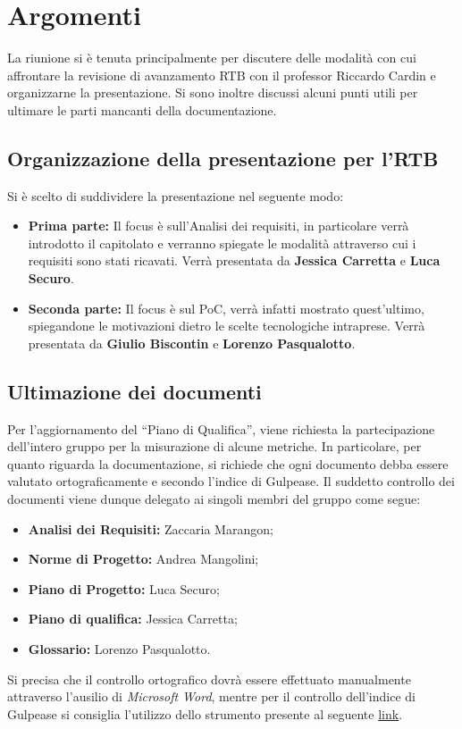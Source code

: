 \section{Argomenti} \label{sec:argomenti}
La riunione si è tenuta principalmente per discutere delle modalità con cui affrontare la revisione di avanzamento RTB con il professor Riccardo Cardin e organizzarne la presentazione. Si sono inoltre discussi alcuni punti utili per ultimare le parti mancanti della documentazione.

\subsection{Organizzazione della presentazione per l'RTB}
Si è scelto di suddividere la presentazione nel seguente modo:
\begin{itemize}
    \item \textbf{Prima parte:} Il focus è sull'Analisi dei requisiti, in particolare verrà introdotto il capitolato e verranno spiegate le modalità attraverso cui i requisiti sono stati ricavati. Verrà presentata da \textbf{Jessica Carretta} e \textbf{Luca Securo}.
    \item \textbf{Seconda parte:} Il focus è sul PoC, verrà infatti mostrato quest'ultimo, spiegandone le motivazioni dietro le scelte tecnologiche intraprese. Verrà presentata da \textbf{Giulio Biscontin} e \textbf{Lorenzo Pasqualotto}.
\end{itemize}

\subsection{Ultimazione dei documenti}
Per l'aggiornamento del ``Piano di Qualifica'', viene richiesta la partecipazione dell'intero gruppo per la misurazione di alcune metriche. In particolare, per quanto riguarda la documentazione, si richiede che ogni documento debba essere valutato ortograficamente e secondo l'indice di Gulpease. Il suddetto controllo dei documenti viene dunque delegato ai singoli membri del gruppo come segue:
\begin{itemize}
    \item \textbf{Analisi dei Requisiti:} Zaccaria Marangon;
    \item \textbf{Norme di Progetto:} Andrea Mangolini;
    \item \textbf{Piano di Progetto:} Luca Securo;
    \item \textbf{Piano di qualifica:} Jessica Carretta;
    \item \textbf{Glossario:} Lorenzo Pasqualotto.
\end{itemize}
Si precisa che il controllo ortografico dovrà essere effettuato manualmente attraverso l'ausilio di \textit{Microsoft Word}, mentre per il controllo dell'indice di Gulpease si consiglia l'utilizzo dello strumento presente al seguente \href{https://www.dogmadynamics.com/calcolo-indice-lettura-facile.html}{link}.